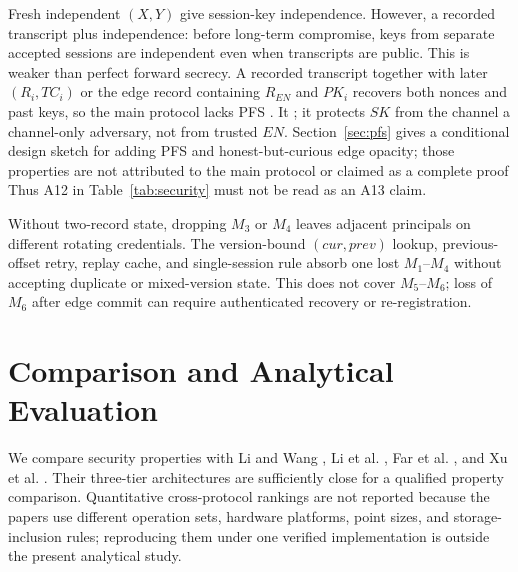 \documentclass[cmc,article,submit,moreauthors,pdftex]{Definitions/tsp}
\providecommand{\DIFadd}[1]{{\protect\color{blue} \sf #1}} %
\providecommand{\DIFdel}[1]{{\protect\color{red} \scriptsize #1}} %
\providecommand{\DIFaddbegin}{} %
\providecommand{\DIFaddend}{} %
\providecommand{\DIFdelbegin}{} %
\providecommand{\DIFdelend}{} %
\begin{document}
\DIFdelend Fresh independent $(X,Y)$ give session-key \DIFdelbegin \DIFdel{independence. However, a recorded transcript plus }\DIFdelend \DIFaddbegin \DIFadd{independence: before long-term compromise, keys from separate accepted sessions are independent even when transcripts are public. This is weaker than perfect forward secrecy. A recorded transcript together with }\DIFaddend later $(R_i,TC_i)$ or \DIFaddbegin \DIFadd{the edge record containing }\DIFaddend $R_{EN}$ \DIFaddbegin \DIFadd{and $PK_i$ }\DIFaddend recovers both nonces and past keys, so the main protocol lacks PFS\DIFdelbegin \DIFdel{. It }\DIFdelend \DIFaddbegin \DIFadd{; it }\DIFaddend protects $SK$ from \DIFdelbegin \DIFdel{the channel }\DIFdelend \DIFaddbegin \DIFadd{a channel-only }\DIFaddend adversary, not \DIFaddbegin \DIFadd{from }\DIFaddend trusted $EN$. \DIFdelbegin \DIFdel{Section~\ref{sec:pfs} gives a conditional design sketch for adding PFS and honest-but-curious edge opacity; those properties are not attributed to the main protocol or claimed as a complete proof}\DIFdelend \DIFaddbegin \DIFadd{Thus A12 in Table~\ref{tab:security} must not be read as an A13 claim}\DIFaddend .

\DIFdelbegin %

\DIFdel{Without two-record state, dropping $M_3$ or $M_4$ leaves adjacent principals on different rotating credentials. The version-bound $(cur,prev)$ lookup, previous-offset retry, replay cache, and single-session rule absorb one lost $M_1$--$M_4$ without accepting duplicate or mixed-version state. This does not cover $M_5$--$M_6$; loss of $M_6$ after edge commit can require authenticated recovery or re-registration.
}%

\DIFdelend %
\section{Comparison and Analytical Evaluation}\label{sec:eval}

We compare security properties with Li and Wang \cite{li2019twofactor}, Li et al. \cite{li2018ecc}, Far et al. \cite{far}, and Xu et al. \cite{xu}. Their three-tier architectures are sufficiently close for a qualified property comparison. Quantitative cross-protocol rankings are not reported because the papers use different operation sets, hardware platforms, point sizes, and storage-inclusion rules; reproducing them under one verified implementation is outside the present analytical study.
\end{document}
